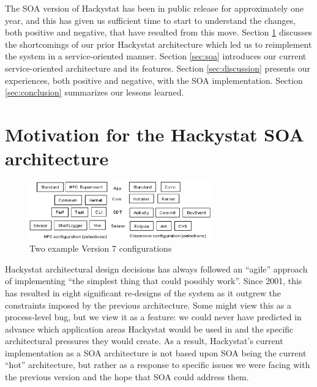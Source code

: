 \documentclass[conference,compsoc]{IEEEtran}
\begin{document}
The SOA version of Hackystat has been in public release for approximately
one year, and this has given us sufficient time to start to understand the
changes, both positive and negative, that have resulted from this move.
Section \ref{sec:motivation} discusses the shortcomings of our prior
Hackystat architecture which led us to reimplement the system in a
service-oriented manner.  Section \ref{sec:soa} introduces our current
service-oriented architecture and its features.  Section
\ref{sec:discussion} presents our experiences, both positive and negative,
with the SOA implementation.  Section \ref{sec:conclusion} summarizes our
lessons learned.


\section{Motivation for the Hackystat SOA architecture}
\label{sec:motivation}


\begin{figure}[ht]
  \center
  \includegraphics[width=0.7\textwidth]{configurations5.eps}
  \caption{Two example Version 7 configurations}
  \label{fig:configurations}
\end{figure} 

Hackystat architectural design decisions has always followed an ``agile''
approach of implementing ``the simplest thing that could possibly work''.
Since 2001, this has resulted in eight significant re-designs of the system
as it outgrew the constraints imposed by the previous architecture.  Some
might view this as a process-level bug, but we view it as a feature: we
could never have predicted in advance which application areas Hackystat
would be used in and the specific architectural pressures they would
create.  As a result, Hackystat's current implementation as a SOA
architecture is not based upon SOA being the current ``hot'' architecture,
but rather as a response to specific issues we were facing with the
previous version and the hope that SOA could address them.
\end{document}
